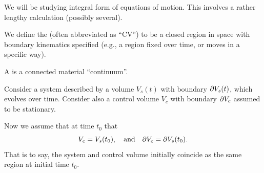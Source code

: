

\begin{node}
We will be studying integral form of equations of motion. This
involves a rather lengthy calculation (possibly several).
\end{node}

\begin{definition}
We define the  (often abbreviated as ``CV'') to
be a closed region in space with boundary kinematics specified (e.g.,
a region fixed over time, or moves in a specific way).
\end{definition}

\begin{definition}
A  is a connected material ``continuum''.
\end{definition}

\begin{node}
Consider a system described by a volume $V_{s}(t)$ with
boundary $\partial V_{s}(t)$, which evolves over time. Consider also a control
volume $V_{c}$ with boundary $\partial V_{c}$ assumed to be
stationary.

Now we assume that at time $t_{0}$ that
\begin{equation}
V_{c}=V_{s}(t_{0}),\quad\mbox{and}\quad\partial V_{c}=\partial V_{s}(t_{0}).
\end{equation}
That is to say, the system and control volume initially coincide as
the same region at initial time $t_{0}$.
\end{node}

